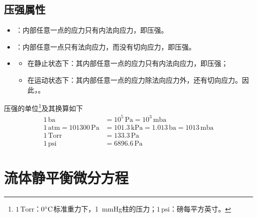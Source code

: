 
\subsection{压强属性}
\begin{itemize}
	\item \blue[静止流体]：内部任意一点的应力只有内法向应力，即压强。\vspace*{-0.5em}
	\item \blue[无粘理想流体]：内部任意一点只有法向应力，而没有切向应力，即压强。\vspace*{-0.5em}
	\item \blue[粘性流体]\vspace*{-0.5em}
	\begin{itemize}
		\item 在静止状态下：其内部任意一点的应力只有内法向应力，即压强；\vspace*{-0.5em}
		\item 在运动状态下：其内部任意一点的应力除法向应力外，还有切向应力。因此，\red[粘性流体的压强严格说指的是三个互相垂直方向的内法向应力的平均值]。
	\end{itemize}
\end{itemize}

\noindent 压强的单位\footnote{$1 \, \text{Torr}$：$0{}^{\circ} \text{C}$标准重力下，1 $\,$mmHg柱的压力；$1 \, \text{psi}$：磅每平方英寸。}及其换算如下
\begin{equation}
	\begin{split}
			1 \, \text{ba} &= 10^5 \, \text{Pa} = 10^3 \, \text{mba} \\
			1 \, \text{atm} = 101300 \, \text{Pa}&= 101.3 \, \text{kPa} = 1.013 \, \text{ba} = 1013 \, \text{mba}\\
			1 \, \text{Torr} &= 133.3 \, \text{Pa}\\
			1 \, \text{psi} &= 6896.6 \, \text{Pa}
	\end{split}
\end{equation}

\section{流体静平衡微分方程}
